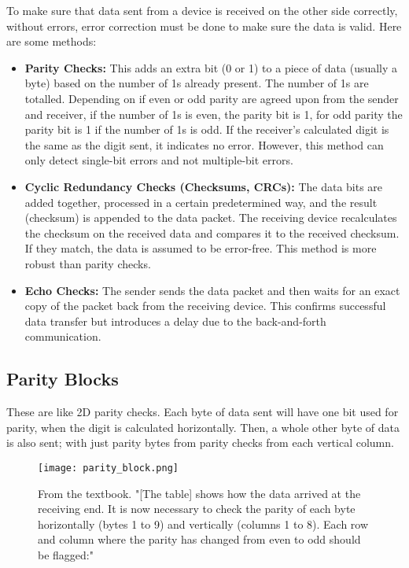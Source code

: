 \documentclass[../main.tex]{subfiles}
\begin{document}
To make sure that data sent from a device is received on the other side correctly, without errors, error correction must be done to make sure the data is valid. Here are some methods:

\begin{itemize}
    \item \textbf{Parity Checks:} This adds an extra bit (0 or 1) to a piece of data (usually a byte) based on the number of 1s already present. The number of 1s are totalled. Depending on if even or odd parity are agreed upon from the sender and receiver, if the number of 1s is even, the parity bit is 1, for odd parity the parity bit is 1 if the number of 1s is odd. If the receiver's calculated digit is the same as the digit sent, it indicates no error. However, this method can only detect single-bit errors and not multiple-bit errors.
    \item \textbf{Cyclic Redundancy Checks (Checksums, CRCs):} The data bits are added together, processed in a certain predetermined way, and the result (checksum) is appended to the data packet. The receiving device recalculates the checksum on the received data and compares it to the received checksum. If they match, the data is assumed to be error-free. This method is more robust than parity checks.
    \item \textbf{Echo Checks:} The sender sends the data packet and then waits for an exact copy of the packet back from the receiving device. This confirms successful data transfer but introduces a delay due to the back-and-forth communication.
\end{itemize}

\subsection{Parity Blocks}

These are like 2D parity checks. Each byte of data sent will have one bit used for parity, when the digit is calculated horizontally. Then, a whole other byte of data is also sent; with just parity bytes from parity checks from each vertical column.

\begin{figure}[H]
    \centering
    \texttt{[image: parity\_block.png]}
    \caption{From the textbook. "[The table] shows how the data arrived at the receiving end. It is now necessary to check the parity of each byte horizontally (bytes 1 to 9) and vertically (columns 1 to 8). Each row and column where the parity has changed from even to odd should be flagged:"}
    \label{fig:parity_block}
\end{figure}
\end{document}
